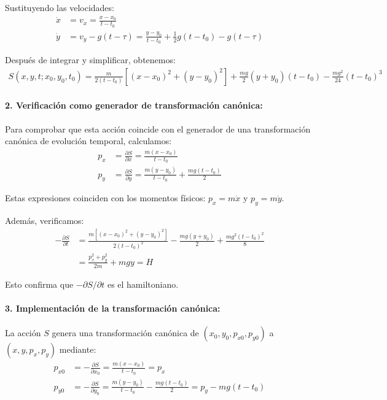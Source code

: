 \documentclass[12pt]{article}
\begin{document}
\begin{enumerate}
  Sustituyendo las velocidades:
  \begin{align}
  \dot{x} &= v_x = \frac{x-x_0}{t-t_0} \\
  \dot{y} &= v_y - g(t-\tau) = \frac{y-y_0}{t-t_0} + \frac{1}{2}g(t-t_0) - g(t-\tau)
  \end{align}

  Después de integrar y simplificar, obtenemos:
  \begin{align}
  S(x,y,t;x_0,y_0,t_0) = \frac{m}{2(t-t_0)}[(x-x_0)^2 + (y-y_0)^2] + \frac{mg}{2}(y+y_0)(t-t_0) - \frac{mg^2}{24}(t-t_0)^3
  \end{align}

  \paragraph{2. Verificación como generador de transformación canónica:}

  Para comprobar que esta acción coincide con el generador de una transformación canónica de evolución temporal, calculamos:
  \begin{align}
  p_x &= \frac{\partial S}{\partial x} = \frac{m(x-x_0)}{t-t_0} \\
  p_y &= \frac{\partial S}{\partial y} = \frac{m(y-y_0)}{t-t_0} + \frac{mg(t-t_0)}{2}
  \end{align}

  Estas expresiones coinciden con los momentos físicos: $p_x = m\dot{x}$ y $p_y = m\dot{y}$.

  Además, verificamos:
  \begin{align}
  -\frac{\partial S}{\partial t} &= \frac{m[(x-x_0)^2+(y-y_0)^2]}{2(t-t_0)^2} - \frac{mg(y+y_0)}{2} + \frac{mg^2(t-t_0)^2}{8} \\
  &= \frac{p_x^2+p_y^2}{2m} + mgy = H
  \end{align}

  Esto confirma que $-\partial S/\partial t$ es el hamiltoniano.

  \paragraph{3. Implementación de la transformación canónica:}

  La acción $S$ genera una transformación canónica de $(x_0,y_0,p_{x0},p_{y0})$ a $(x,y,p_x,p_y)$ mediante:
  \begin{align}
  p_{x0} &= -\frac{\partial S}{\partial x_0} = \frac{m(x-x_0)}{t-t_0} = p_x \\
  p_{y0} &= -\frac{\partial S}{\partial y_0} = \frac{m(y-y_0)}{t-t_0} - \frac{mg(t-t_0)}{2} = p_y - mg(t-t_0)
  \end{align}


\end{enumerate}
\end{document}
